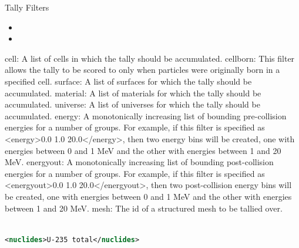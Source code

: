 \documentclass[serif]{beamer}
\begin{document}
\begin{frame}[fragile]{Tally Filters}

  \begin{itemize}
    \item 
    \item 
  \end{itemize}

cell:       A list of cells in which the tally should be accumulated.
cellborn:   This filter allows the tally to be scored to only when particles were originally born in a specified cell.
surface:    A list of surfaces for which the tally should be accumulated.
material:   A list of materials for which the tally should be accumulated.
universe:   A list of universes for which the tally should be accumulated.
energy:     A monotonically increasing list of bounding pre-collision energies for a number of groups. For example, if this filter is specified as <energy>0.0 1.0 20.0</energy>, then two energy bins will be created, one with energies between 0 and 1 MeV and the other with energies between 1 and 20 MeV.
energyout:  A monotonically increasing list of bounding post-collision energies for a number of groups. For example, if this filter is specified as <energyout>0.0 1.0 20.0</energyout>, then two post-collision energy bins will be created, one with energies between 0 and 1 MeV and the other with energies between 1 and 20 MeV.
mesh:       The id of a structured mesh to be tallied over.


  \begin{scriptsize}
    \begin{lstlisting}[language=XML,gobble=4]

<nuclides>U-235 total</nuclides>

    \end{lstlisting}
  \end{scriptsize}

\end{frame}


\end{document}

